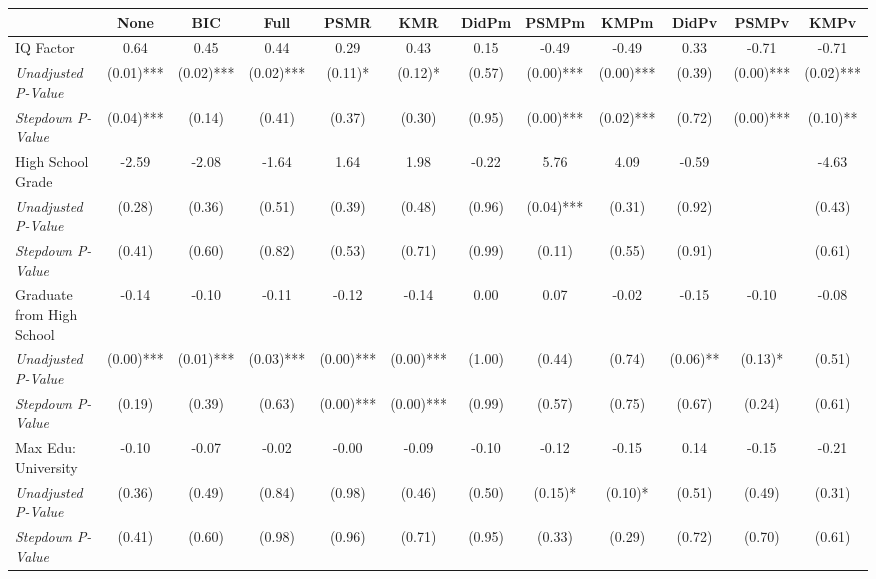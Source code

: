 \begin{tabular}{l c c c c c c c c c c c}
\toprule
 & None & BIC & Full & PSMR & KMR & DidPm & PSMPm & KMPm & DidPv & PSMPv & KMPv \\
\midrule
IQ Factor & 0.64 & 0.45 & 0.44 & 0.29 & 0.43 & 0.15 & -0.49 & -0.49 & 0.33 & -0.71 & -0.71 \\
\quad \textit{Unadjusted P-Value} & (0.01)*** & (0.02)*** & (0.02)*** & (0.11)* & (0.12)* & (0.57) & (0.00)*** & (0.00)*** & (0.39) & (0.00)*** & (0.02)*** \\
\quad \textit{Stepdown P-Value} & (0.04)*** & (0.14) & (0.41) & (0.37) & (0.30) & (0.95) & (0.00)*** & (0.02)*** & (0.72) & (0.00)*** & (0.10)** \\
High School Grade & -2.59 & -2.08 & -1.64 & 1.64 & 1.98 & -0.22 & 5.76 & 4.09 & -0.59 & & -4.63 \\
\quad \textit{Unadjusted P-Value} & (0.28) & (0.36) & (0.51) & (0.39) & (0.48) & (0.96) & (0.04)*** & (0.31) & (0.92) & & (0.43) \\
\quad \textit{Stepdown P-Value} & (0.41) & (0.60) & (0.82) & (0.53) & (0.71) & (0.99) & (0.11) & (0.55) & (0.91) & & (0.61) \\
Graduate from High School & -0.14 & -0.10 & -0.11 & -0.12 & -0.14 & 0.00 & 0.07 & -0.02 & -0.15 & -0.10 & -0.08 \\
\quad \textit{Unadjusted P-Value} & (0.00)*** & (0.01)*** & (0.03)*** & (0.00)*** & (0.00)*** & (1.00) & (0.44) & (0.74) & (0.06)** & (0.13)* & (0.51) \\
\quad \textit{Stepdown P-Value} & (0.19) & (0.39) & (0.63) & (0.00)*** & (0.00)*** & (0.99) & (0.57) & (0.75) & (0.67) & (0.24) & (0.61) \\
Max Edu: University & -0.10 & -0.07 & -0.02 & -0.00 & -0.09 & -0.10 & -0.12 & -0.15 & 0.14 & -0.15 & -0.21 \\
\quad \textit{Unadjusted P-Value} & (0.36) & (0.49) & (0.84) & (0.98) & (0.46) & (0.50) & (0.15)* & (0.10)* & (0.51) & (0.49) & (0.31) \\
\quad \textit{Stepdown P-Value} & (0.41) & (0.60) & (0.98) & (0.96) & (0.71) & (0.95) & (0.33) & (0.29) & (0.72) & (0.70) & (0.61) \\
\bottomrule
\end{tabular}
